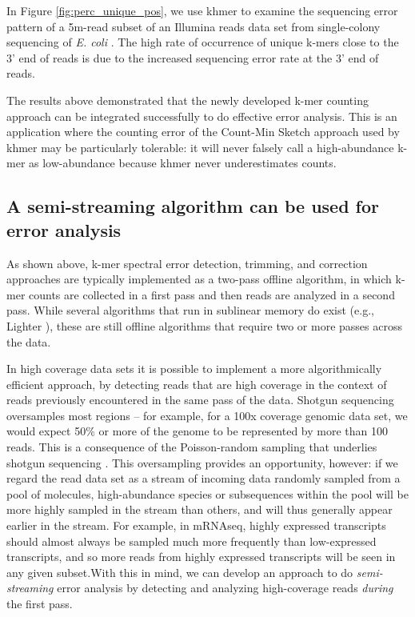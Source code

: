 In Figure \ref{fig:perc_unique_pos}, we use khmer to examine the sequencing
error pattern of a 5m-read subset of an Illumina reads data set from
single-colony sequencing of {\em E. coli} \cite{pubmed21926975}.  The high rate
of occurrence of unique k-mers close to the 3' end of reads is due to the
increased sequencing error rate at the 3' end of reads.


The results above demonstrated that the newly developed 
k-mer counting approach can be integrated successfully to do effective error 
analysis. This is an application where the counting error of the Count-Min Sketch approach
used by khmer may be particularly tolerable: it will never falsely
call a high-abundance k-mer as low-abundance because khmer never
underestimates counts.



\subsection{A semi-streaming algorithm can be used for error analysis}



As shown above, k-mer spectral error detection, trimming, and correction approaches
are typically implemented as a two-pass offline algorithm, in which
k-mer counts are collected in a first pass and then reads are
analyzed in a second pass.  While several algorithms that run in
sublinear memory do exist (e.g., Lighter \cite{lighter}), these are
still offline algorithms that require two or more passes across
the data.



In high coverage data sets it is possible to implement a more
algorithmically efficient approach, by detecting reads that are high
coverage in the context of reads previously encountered in the same
pass of the data. 
Shotgun sequencing oversamples most regions -- for example, for a 100x
coverage genomic data set, we would expect 50\% or more of the genome
to be represented by more than 100 reads.  This is a consequence of
the Poisson-random sampling that underlies shotgun sequencing
\cite{waterman}.  This oversampling provides an opportunity, however:
if we regard the read data set as a stream of incoming data randomly
sampled from a pool of molecules, high-abundance species or
subsequences within the pool will be more highly sampled in the stream
than others, and will thus generally appear earlier in the stream.
For example, in mRNAseq, highly expressed transcripts should almost
always be sampled much more frequently than low-expressed transcripts,
and so more reads from highly expressed transcripts will be seen in
any given subset.With this in mind, we can develop an approach to do 
{\em semi-streaming} error analysis by detecting and
analyzing high-coverage reads {\em during} the first pass. 

